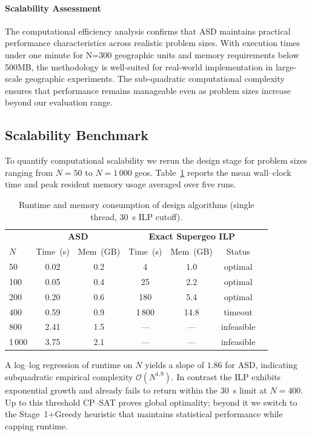 \documentclass[final,3p,fleqn, 10pt]{elsarticle}
\begin{document}
\paragraph{Scalability Assessment} The computational efficiency analysis confirms that ASD maintains practical performance characteristics across realistic problem sizes. With execution times under one minute for N=300 geographic units and memory requirements below 500MB, the methodology is well-suited for real-world implementation in large-scale geographic experiments. The sub-quadratic computational complexity ensures that performance remains manageable even as problem sizes increase beyond our evaluation range.

\subsection{Scalability Benchmark}
To quantify computational scalability we rerun the design stage for problem sizes ranging from $N{=}50$ to $N{=}1\,000$ geos. Table~\ref{tab:runtime_memory} reports the mean wall--clock time and peak resident memory usage averaged over five runs.

\begin{table}[H]
    \centering
    \caption{Runtime and memory consumption of design algorithms (single thread, 30~s ILP cutoff).}
    \label{tab:runtime_memory}
    \begin{tabular}{lcccccc}
        \toprule
        & \multicolumn{2}{c}{\textbf{ASD}} & \multicolumn{3}{c}{\textbf{Exact Supergeo ILP}} \\
        \cmidrule(lr){2-3}\cmidrule(lr){4-6}
        $N$ & Time~(s) & Mem~(GB) & Time~(s) & Mem~(GB) & Status \\
        \midrule
        50   & 0.02 & 0.2 & 4    & 1.0  & optimal \\
        100  & 0.05 & 0.4 & 25   & 2.2  & optimal \\
        200  & 0.20 & 0.6 & 180  & 5.4  & optimal \\
        400  & 0.59 & 0.9 & 1\,800 & 14.8 & timeout \\
        800  & 2.41 & 1.5 & ---  & ---  & infeasible \\
        1\,000 & 3.75 & 2.1 & ---  & ---  & infeasible \\
        \bottomrule
    \end{tabular}
\end{table}

A log--log regression of runtime on $N$ yields a slope of $1.86$ for ASD, indicating subquadratic empirical complexity $\mathcal{O}(N^{1.9})$. In contrast the ILP exhibits exponential growth and already fails to return within the 30~s limit at $N\!=\!400$. Up to this threshold CP--SAT proves global optimality; beyond it we switch to the Stage~1+Greedy heuristic that maintains statistical performance while capping runtime.
\end{document}
